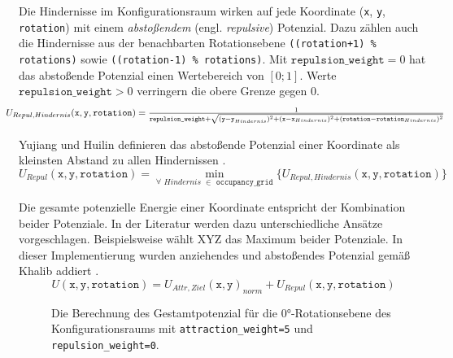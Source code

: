 \vspace*{-0.1cm}
Die Hindernisse im Konfigurationsraum wirken auf jede Koordinate (\texttt{x}, \texttt{y}, \texttt{rotation}) mit einem \textit{abstoßendem} (engl. \textit{repulsive}) Potenzial. Dazu zählen auch die Hindernisse aus der benachbarten Rotationsebene \texttt{((rotation+1) \% rotations)} sowie \texttt{((rotation-1) \% rotations)}. Mit $\texttt{repulsion\_weight}=0$ hat das abstoßende Potenzial einen Wertebereich von $[0;1]$. Werte $\texttt{repulsion\_weight} > 0 $ verringern die obere Grenze gegen $0$.
\vspace*{0.2cm}
\begin{equation*}
\hspace*{-0.075\linewidth}
\resizebox{1.15\linewidth}{!}{
  $ U_{Repul, Hindernis}(\texttt{x}, \texttt{y}, \texttt{rotation}) = \frac{1}{\texttt{repulsion\_weight} + \sqrt{(\texttt{y} - \texttt{y}_{Hindernis})^2 + (\texttt{x} - \texttt{x}_{Hindernis})^2 + (\texttt{rotation} - \texttt{rotation}_{Hindernis})^2}}
$}
\hspace*{-0.075\linewidth}
\end{equation*}

\vspace*{-0.1cm}
Yujiang und Huilin definieren das abstoßende Potenzial einer Koordinate als kleinsten Abstand zu allen Hindernissen \cite{yujiang.2017}.
\vspace*{0.2cm}
\begin{equation*}
U_{Repul}(\texttt{x}, \texttt{y}, \texttt{rotation}) = \min_{\forall \,\,Hindernis \,\,\in \texttt{ occupancy\_grid}} \{ U_{Repul, Hindernis}(\texttt{x}, \texttt{y}, \texttt{rotation}) \}
\end{equation*}

\vspace*{-0.1cm}
Die gesamte potenzielle Energie einer Koordinate entspricht der Kombination beider Potenziale.
In der Literatur werden dazu unterschiedliche Ansätze vorgeschlagen. Beispielsweise wählt XYZ das Maximum beider Potenziale. In dieser Implementierung wurden anziehendes und abstoßendes Potenzial gemäß Khalib addiert \cite{khatib.1985}.
\vspace*{0.2cm}
\begin{equation*}
U(\texttt{x}, \texttt{y}, \texttt{rotation}) = U_{Attr, Ziel}(\texttt{x}, \texttt{y})_{norm} + U_{Repul}(\texttt{x}, \texttt{y}, \texttt{rotation})
\end{equation*}
\begin{figure}[H]
	\centering
	\footnotesize
	\centerline{}
	\caption{Die Berechnung des Gestamtpotenzial für die $0$°-Rotationsebene des Konfigurationsraums mit \texttt{attraction\_weight=5} und \texttt{repulsion\_weight=0}.}
\end{figure}

